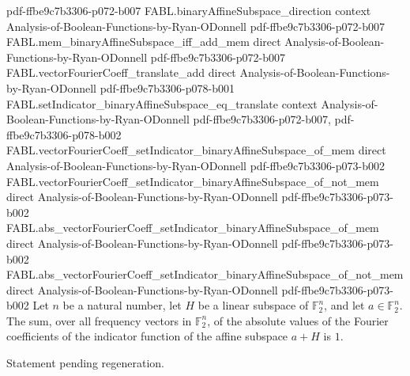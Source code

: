 \begin{theorem}
  {pdf-ffbe9c7b3306-p072-b007}
\proofstep
  {FABL.binaryAffineSubspace_direction}
  {context}
  {Analysis-of-Boolean-Functions-by-Ryan-ODonnell}
  {pdf-ffbe9c7b3306-p072-b007}
\proofstep
  {FABL.mem_binaryAffineSubspace_iff_add_mem}
  {direct}
  {Analysis-of-Boolean-Functions-by-Ryan-ODonnell}
  {pdf-ffbe9c7b3306-p072-b007}
\proofstep
  {FABL.vectorFourierCoeff_translate_add}
  {direct}
  {Analysis-of-Boolean-Functions-by-Ryan-ODonnell}
  {pdf-ffbe9c7b3306-p078-b001}
\proofstep
  {FABL.setIndicator_binaryAffineSubspace_eq_translate}
  {context}
  {Analysis-of-Boolean-Functions-by-Ryan-ODonnell}
  {pdf-ffbe9c7b3306-p072-b007,
    pdf-ffbe9c7b3306-p078-b002}
\proofstep
  {FABL.vectorFourierCoeff_setIndicator_binaryAffineSubspace_of_mem}
  {direct}
  {Analysis-of-Boolean-Functions-by-Ryan-ODonnell}
  {pdf-ffbe9c7b3306-p073-b002}
\proofstep
  {FABL.vectorFourierCoeff_setIndicator_binaryAffineSubspace_of_not_mem}
  {direct}
  {Analysis-of-Boolean-Functions-by-Ryan-ODonnell}
  {pdf-ffbe9c7b3306-p073-b002}
\proofstep
  {FABL.abs_vectorFourierCoeff_setIndicator_binaryAffineSubspace_of_mem}
  {direct}
  {Analysis-of-Boolean-Functions-by-Ryan-ODonnell}
  {pdf-ffbe9c7b3306-p073-b002}
\proofstep
  {FABL.abs_vectorFourierCoeff_setIndicator_binaryAffineSubspace_of_not_mem}
  {direct}
  {Analysis-of-Boolean-Functions-by-Ryan-ODonnell}
  {pdf-ffbe9c7b3306-p073-b002}
Let $n$ be a natural number, let $H$ be a linear subspace of $\mathbb{F}_2^n$, and let
$a\in\mathbb{F}_2^n$. The sum, over all frequency vectors in $\mathbb{F}_2^n$, of the
absolute values of the Fourier coefficients of the indicator function of the affine
subspace $a+H$ is $1$.
\end{theorem}

\begin{theorem}
\label{FABL.spectralPNorm_one_setIndicator_binaryAffineSubspace}
\leanok
{}
Statement pending regeneration.
\end{theorem}
